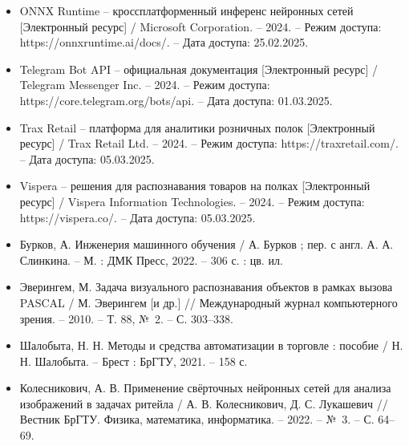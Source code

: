 {\begin{itemize}[leftmargin=2.15cm, labelwidth=0.65cm, labelsep=0.0cm]
    \item[\theimagecntr.] ONNX Runtime {--} кроссплатформенный инференс нейронных сетей [Электронный ресурс] / Microsoft Corporation. {--} 2024. {--} Режим доступа: \\ https://onnxruntime.ai/docs/. {--} Дата доступа: 25.02.2025.
    \addtocounter{imagecntr}{1}

    \item[\theimagecntr.] Telegram Bot API {--} официальная документация [Электронный ресурс] / Telegram Messenger Inc. {--} 2024. {--} Режим доступа: https://core.telegram.org/bots/api. {--} Дата доступа: 01.03.2025.
    \addtocounter{imagecntr}{1}

    \item[\theimagecntr.] Trax Retail {--} платформа для аналитики розничных полок [Электронный ресурс] / Trax Retail Ltd. {--} 2024. {--} Режим доступа: https://traxretail.com/. {--} Дата доступа: 05.03.2025.
    \addtocounter{imagecntr}{1}

    \item[\theimagecntr.] Vispera {--} решения для распознавания товаров на полках [Электронный ресурс] / Vispera Information Technologies. {--} 2024. {--} Режим доступа: https://vispera.co/. {--} Дата доступа: 05.03.2025.
    \addtocounter{imagecntr}{1}

    \item[\theimagecntr.] Бурков, А. Инженерия машинного обучения / А. Бурков ; пер. с англ. А. А. Слинкина. {--} М. : ДМК Пресс, 2022. {--} 306 с. : цв. ил.
    \addtocounter{imagecntr}{1}

    \item[\theimagecntr.] Эверингем, М. Задача визуального распознавания объектов в рамках вызова PASCAL / М. Эверингем [и др.] // Международный журнал компьютерного зрения. {--} 2010. {--} Т. 88, №~2. {--} С. 303–338.
    \addtocounter{imagecntr}{1}

    \item[\theimagecntr.] Шалобыта, Н. Н. Методы и средства автоматизации в торговле : пособие / Н. Н. Шалобыта. {--} Брест : БрГТУ, 2021. {--} 158 с.
    \addtocounter{imagecntr}{1}

    \item[\theimagecntr.] Колесникович, А. В. Применение свёрточных нейронных сетей для анализа изображений в задачах ритейла / А. В. Колесникович, Д. С. Лукашевич // Вестник БрГТУ. Физика, математика, информатика. {--} 2022. {--} №~3. {--} С. 64–69.
    \addtocounter{imagecntr}{1}


\end{itemize}

}